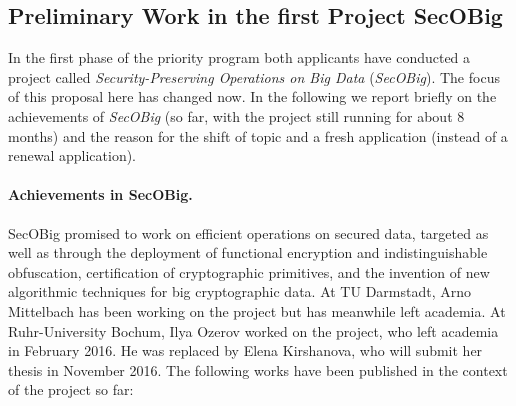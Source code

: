 
\subsection{Preliminary Work in the first Project SecOBig}\label{sec:secobig}

In the first phase of the priority program both applicants have conducted a project called \emph{Security-Preserving Operations on Big Data} (\emph{SecOBig}).  The focus of this proposal here has changed now. In the following we report briefly on the achievements of \emph{SecOBig} (so far, with the project still running for about 8 months) and the reason for the shift of topic and a fresh application (instead of a renewal application).

\paragraph{Achievements in SecOBig.}
SecOBig promised to work on efficient operations on secured data, targeted as well as through the deployment of functional encryption and indistinguishable obfuscation, certification of cryptographic primitives, and the invention of new algorithmic techniques for big cryptographic data. At TU Darmstadt, Arno Mittelbach has been working on the project but has meanwhile left academia. At Ruhr-University Bochum, Ilya Ozerov worked on the project, who left academia in February 2016. He was replaced by Elena Kirshanova, who will submit her thesis in November 2016.
%
The following works have been published in the context of the project so far: 

